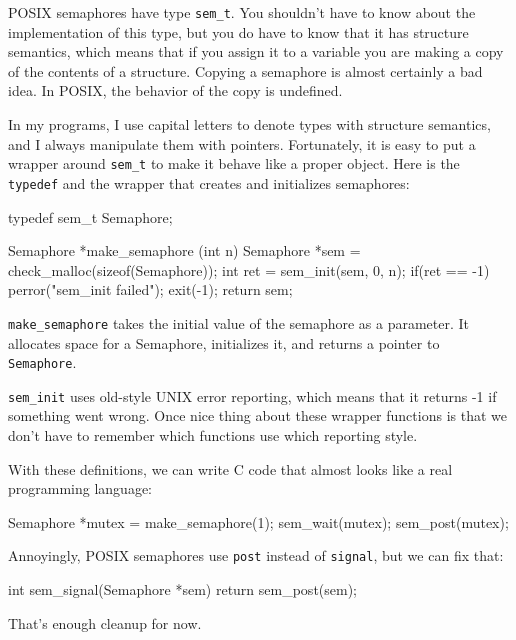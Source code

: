 \documentclass{book}
\begin{document}
POSIX semaphores have type {\tt sem\_t}.  You shouldn't have
to know about the implementation of this type, but you do
have to know that it has structure semantics, which means that
if you assign it to a variable you are making a copy of the
contents of a structure.  Copying a semaphore is almost certainly
a bad idea.  In POSIX, the behavior of the copy is undefined.

In my programs, I use capital letters to denote types with structure semantics, and I always manipulate them with pointers. Fortunately, it is easy to put a wrapper around {\tt sem\_t} to make it behave like a proper object.  Here is the {\tt typedef} and the wrapper that creates and initializes semaphores:

\begin{unbreakable}[]{}
typedef sem_t Semaphore;

Semaphore *make_semaphore (int n) {
  Semaphore *sem = 
    check_malloc(sizeof(Semaphore));
  int ret = sem_init(sem, 0, n);
  if(ret == -1) {
    perror("sem_init failed");
    exit(-1);    
  }
  return sem;
}
\end{unbreakable}

{\tt make\_semaphore} takes the initial value of the semaphore
as a parameter.  It allocates space for a Semaphore, initializes
it, and returns a pointer to {\tt Semaphore}.

{\tt sem\_init} uses old-style UNIX error reporting, which means
that it returns -1 if something went wrong.  Once nice thing
about these wrapper functions is that we don't have to remember
which functions use which reporting style.

With these definitions, we can write C code that almost looks
like a real programming language:

\begin{unbreakable}[]{}
Semaphore *mutex = make_semaphore(1);
sem_wait(mutex);
sem_post(mutex);
\end{unbreakable}

Annoyingly, POSIX semaphores use {\tt post} instead of
    {\tt signal}, but we can fix that:

\begin{unbreakable}[]{}
int sem_signal(Semaphore *sem) {
  return sem_post(sem);
}
\end{unbreakable}

That's enough cleanup for now.
\end{document}
